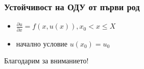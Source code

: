 \documentclass[14pt]{beamer}
\begin{document}
\begin{frame}
\frametitle{Устойчивост на ОДУ от първи род}
\begin{itemize}
\item $\frac{\partial u}{\partial x} = f(x,u(x)), x_0 < x \leq X$
\item начално условие $u(x_0) = u_0$
\end{itemize}
\end{frame}


\begin{frame}
\begin{center}
Благодарим за вниманието!
\end{center}
\end{frame}
\end{document}
